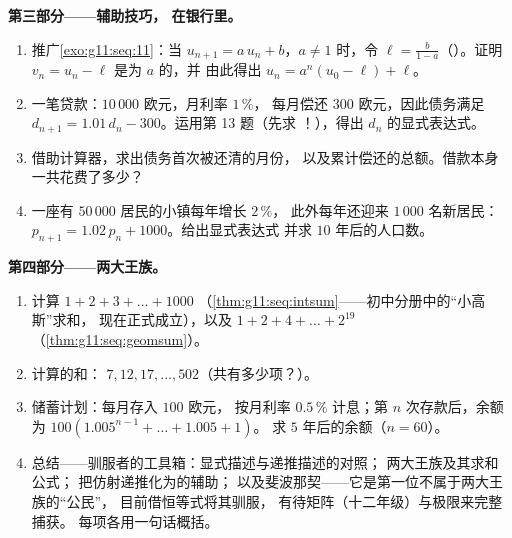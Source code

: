 \begin{problem}
\medskip
\noindent\textbf{第三部分——辅助技巧，
在银行里。}
\begin{enumerate}[resume]
  \item 推广\cref{exo:g11:seq:11}：当
        $u_{n+1} = a\,u_n + b$，$a \neq 1$ 时，令
        $\ell = \frac{b}{1 - a}$（）。证明
        $v_n = u_n - \ell$ 是为 $a$ 的，并
        由此得出
        $u_n = a^n (u_0 - \ell) + \ell$。
  \item 一笔贷款：$10\,000$ 欧元，月利率 $1\,\%$，
        每月偿还 $300$ 欧元，因此债务满足
        $d_{n+1} = 1.01\,d_n - 300$。运用第 13 题（先求
        ！），得出 $d_n$ 的显式表达式。
  \item 借助计算器，求出债务首次被还清的月份，
        以及累计偿还的总额。借款本身
        一共花费了多少？
  \item 一座有 $50\,000$ 居民的小镇每年增长 $2\,\%$，
        此外每年还迎来 $1\,000$ 名新居民：
        $p_{n+1} = 1.02\,p_n + 1000$。给出显式表达式
        并求 $10$ 年后的人口数。
\end{enumerate}

\medskip
\noindent\textbf{第四部分——两大王族。}
\begin{enumerate}[resume]
  \item 计算 $1 + 2 + 3 + \dots + 1000$
        （\cref{thm:g11:seq:intsum}——初中分册中的“小高斯”求和，
        现在正式成立），以及
        $1 + 2 + 4 + \dots + 2^{19}$
        （\cref{thm:g11:seq:geomsum}）。
  \item 计算的和：
        $7, 12, 17, \dots, 502$（共有多少项？）。
  \item 储蓄计划：每月存入 $100$ 欧元，
        按月利率 $0.5\,\%$ 计息；第 $n$ 次存款后，余额为
        $100\left(1.005^{n-1} + \dots + 1.005 + 1\right)$。
        求 $5$ 年后的余额（$n = 60$）。
  \item 总结——驯服者的工具箱：显式描述与递推描述的对照；
        两大王族及其求和公式；
        把仿射递推化为的辅助；
        以及斐波那契——它是第一位不属于两大王族的“公民”，
        目前借恒等式将其驯服，
        有待矩阵（十二年级）与极限来完整捕获。
        每项各用一句话概括。
\end{enumerate}
\end{problem}
